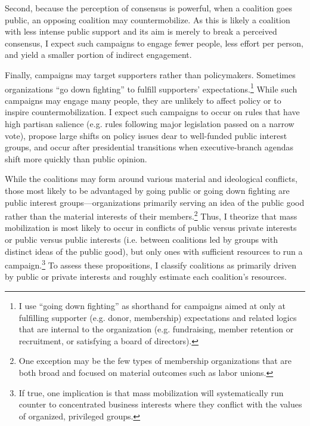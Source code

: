 Second, because the perception of consensus is powerful, when a coalition goes public, an opposing coalition may countermobilize. As this is likely a coalition with less intense public support and its aim is merely to break a perceived consensus, I expect such campaigns to engage fewer people, less effort per person, and yield a smaller portion of indirect engagement. 

Finally, campaigns may target supporters rather than policymakers. Sometimes organizations ``go down fighting'' to fulfill supporters' expectations.\footnote{
I use ``going down fighting'' as shorthand for campaigns aimed at only at fulfilling supporter (e.g. donor, membership) expectations and related logics that are internal to the organization (e.g. fundraising, member retention or recruitment, or satisfying a board of directors).} While such campaigns may engage many people, they are unlikely to affect policy or to inspire countermobilization. I expect such campaigns to occur on rules that have high partisan salience (e.g. rules following major legislation passed on a narrow vote), propose large shifts on policy issues dear to well-funded public interest groups, and occur after presidential transitions when executive-branch agendas shift more quickly than public opinion.



While the coalitions may form around various material and ideological conflicts, those most likely to be advantaged by going public or going down fighting are public interest groups---organizations primarily serving an idea of the public good rather than the material interests of their members.\footnote{
One exception may be the few types of membership organizations that are both broad and focused on material outcomes such as labor unions.} Thus, I theorize that mass mobilization is most likely to occur in conflicts of public versus private interests or public versus public interests (i.e. between coalitions led by groups with distinct ideas of the public good), but only ones with sufficient resources to run a campaign.\footnote{
If true, one implication is that mass mobilization will systematically run counter to concentrated business interests where they conflict with the values of organized, privileged groups.
}
To assess these propositions, I classify coalitions as primarily driven by public or private interests and roughly estimate each coalition's resources. 



